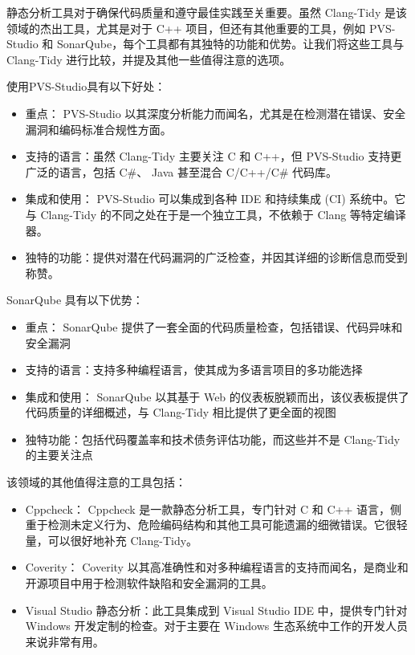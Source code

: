 
静态分析工具对于确保代码质量和遵守最佳实践至关重要。虽然 Clang-Tidy 是该领域的杰出工具，尤其是对于 C++ 项目，但还有其他重要的工具，例如 PVS-Studio 和 SonarQube，每个工具都有其独特的功能和优势。让我们将这些工具与 Clang-Tidy 进行比较，并提及其他一些值得注意的选项。


使用PVS-Studio具有以下好处：

\begin{itemize}
\item
重点： PVS-Studio 以其深度分析能力而闻名，尤其是在检测潜在错误、安全漏洞和编码标准合规性方面。

\item
支持的语言：虽然 Clang-Tidy 主要关注 C 和 C++，但 PVS-Studio 支持更广泛的语言，包括 C\#、 Java 甚至混合 C/C++/C\# 代码库。

\item
集成和使用： PVS-Studio 可以集成到各种 IDE 和持续集成 (CI) 系统中。它与 Clang-Tidy 的不同之处在于是一个独立工具，不依赖于 Clang 等特定编译器。

\item
独特的功能：提供对潜在代码漏洞的广泛检查，并因其详细的诊断信息而受到称赞。
\end{itemize}


SonarQube 具有以下优势：

\begin{itemize}
\item
重点： SonarQube 提供了一套全面的代码质量检查，包括错误、代码异味和安全漏洞

\item
支持的语言：支持多种编程语言，使其成为多语言项目的多功能选择

\item
集成和使用： SonarQube 以其基于 Web 的仪表板脱颖而出，该仪表板提供了代码质量的详细概述，与 Clang-Tidy 相比提供了更全面的视图

\item
独特功能：包括代码覆盖率和技术债务评估功能，而这些并不是 Clang-Tidy 的主要关注点
\end{itemize}


该领域的其他值得注意的工具包括：

\begin{itemize}
\item
Cppcheck： Cppcheck 是一款静态分析工具，专门针对 C 和 C++ 语言，侧重于检测未定义行为、危险编码结构和其他工具可能遗漏的细微错误。它很轻量，可以很好地补充 Clang-Tidy。

\item
Coverity： Coverity 以其高准确性和对多种编程语言的支持而闻名，是商业和开源项目中用于检测软件缺陷和安全漏洞的工具。

\item
Visual Studio 静态分析：此工具集成到 Visual Studio IDE 中，提供专门针对 Windows 开发定制的检查。对于主要在 Windows 生态系统中工作的开发人员来说非常有用。
\end{itemize}

